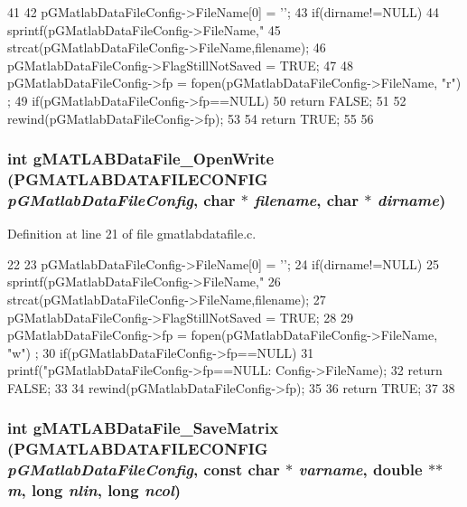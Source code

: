 \begin{DoxyCode}
41 {
42         pGMatlabDataFileConfig->FileName[0] = '\0';
43         if(dirname!=NULL)
44                 sprintf(pGMatlabDataFileConfig->FileName,"%
45         strcat(pGMatlabDataFileConfig->FileName,filename);
46         pGMatlabDataFileConfig->FlagStillNotSaved = TRUE;
47 
48         pGMatlabDataFileConfig->fp = fopen(pGMatlabDataFileConfig->FileName, "r")
      ;
49         if(pGMatlabDataFileConfig->fp==NULL){
50                 return FALSE;
51         }
52         rewind(pGMatlabDataFileConfig->fp);
53 
54         return TRUE;
55 
56 }
\end{DoxyCode}
\subsubsection[{gMATLABDataFile\_\-OpenWrite}]{\setlength{\rightskip}{0pt plus 5cm}int gMATLABDataFile\_\-OpenWrite ({\bf PGMATLABDATAFILECONFIG} {\em pGMatlabDataFileConfig}, \/  char $\ast$ {\em filename}, \/  char $\ast$ {\em dirname})}\label{gmatlabdatafile_8c_af53051d93a0e13032b8735451b077fb9}


Definition at line 21 of file gmatlabdatafile.c.


\begin{DoxyCode}
22 {
23         pGMatlabDataFileConfig->FileName[0] = '\0';
24         if(dirname!=NULL)
25                 sprintf(pGMatlabDataFileConfig->FileName,"%
26         strcat(pGMatlabDataFileConfig->FileName,filename);
27         pGMatlabDataFileConfig->FlagStillNotSaved = TRUE;
28 
29         pGMatlabDataFileConfig->fp = fopen(pGMatlabDataFileConfig->FileName, "w")
      ;
30         if(pGMatlabDataFileConfig->fp==NULL){
31                 printf("\n pGMatlabDataFileConfig->fp==NULL: %
      Config->FileName);
32                 return FALSE;
33         }
34         rewind(pGMatlabDataFileConfig->fp);
35 
36         return TRUE;
37 
38 }
\end{DoxyCode}
\subsubsection[{gMATLABDataFile\_\-SaveMatrix}]{\setlength{\rightskip}{0pt plus 5cm}int gMATLABDataFile\_\-SaveMatrix ({\bf PGMATLABDATAFILECONFIG} {\em pGMatlabDataFileConfig}, \/  const char $\ast$ {\em varname}, \/  double $\ast$$\ast$ {\em m}, \/  long {\em nlin}, \/  long {\em ncol})}\label{gmatlabdatafile_8c_a4c928bd4ef71adea00c53f157ab00bea}


